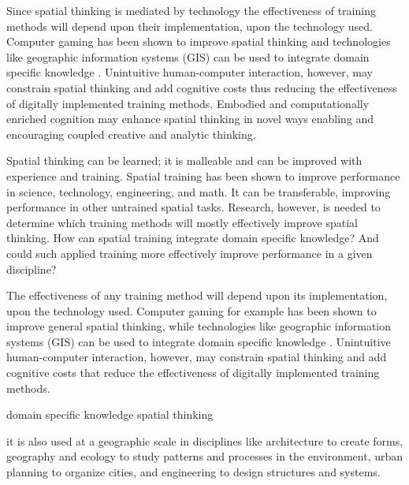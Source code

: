 Since spatial thinking is mediated by technology the effectiveness of training methods will depend upon their implementation, upon the technology used. 
Computer gaming has been shown to improve spatial thinking and technologies like geographic information systems (GIS) can be used to integrate domain specific knowledge \citep{Uttal2013}.
Unintuitive human-computer interaction, however, may constrain spatial thinking and add cognitive costs thus reducing the effectiveness of digitally implemented training methods. 
Embodied and computationally enriched cognition may enhance spatial thinking in novel ways
enabling and encouraging coupled creative and analytic thinking.




Spatial thinking can be learned; it is malleable and can be improved with experience and training. 
Spatial training has been shown to improve performance in science, technology, engineering, and math. 
It can be transferable, improving performance in other untrained spatial tasks. 
Research, however, is needed to determine which training methods will mostly effectively improve spatial thinking. 
How can spatial training integrate domain specific knowledge? And could such applied training more effectively improve performance in a given discipline? \cite{Uttal2013} 

The effectiveness of any training method will depend upon its implementation, upon the technology used. 
Computer gaming for example has been shown to improve general spatial thinking, while technologies like geographic information systems (GIS) can be used to integrate domain specific knowledge \cite{Uttal2013}.
Unintuitive human-computer interaction, however, may constrain spatial thinking and add cognitive costs that reduce the effectiveness of digitally implemented training methods. 


domain specific knowledge
spatial thinking



it is also used at a geographic scale in disciplines like 
architecture to create forms, 
geography and ecology to study patterns and processes in the environment, 
urban planning to organize cities,
and 
engineering to design structures and systems. %



